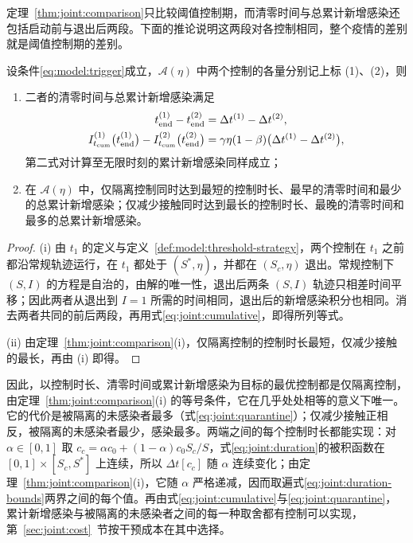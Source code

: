 定理~\ref{thm:joint:comparison}只比较阈值控制期，而清零时间与总累计新增感染还包括启动前与退出后两段。下面的推论说明这两段对各控制相同，整个疫情的差别就是阈值控制期的差别。
\begin{corollaryn}
\label{cor:joint:whole-epidemic}
设条件\eqref{eq:model:trigger}成立，$\mathcal A(\eta)$ 中两个控制的各量分别记上标 (1)、(2)，则
\begin{enumerate}
\renewcommand{\labelenumi}{(\roman{enumi})}
\item 二者的清零时间与总累计新增感染满足
\begin{align}
t_{\rm end}^{(1)}-t_{\rm end}^{(2)}
&=\Delta t^{(1)}-\Delta t^{(2)},\label{eq:joint:whole-time}\\
I_{t_{\mathrm{cum}}}^{(1)}\bigl(t_{\rm end}^{(1)}\bigr)-I_{t_{\mathrm{cum}}}^{(2)}\bigl(t_{\rm end}^{(2)}\bigr)
&=\gamma\eta(1-\beta)\bigl(\Delta t^{(1)}-\Delta t^{(2)}\bigr),
\label{eq:joint:whole-cumulative}
\end{align}
第二式对计算至无限时刻的累计新增感染同样成立；
\item 在 $\mathcal A(\eta)$ 中，仅隔离控制同时达到最短的控制时长、最早的清零时间和最少的总累计新增感染；仅减少接触同时达到最长的控制时长、最晚的清零时间和最多的总累计新增感染。
\end{enumerate}
\end{corollaryn}
\begin{proof}
(i) 由 $t_1$ 的定义与定义~\ref{def:model:threshold-strategy}，两个控制在 $t_1$ 之前都沿常规轨迹运行，在 $t_1$ 都处于 $(S^*,\eta)$，并都在 $(S_c,\eta)$ 退出。常规控制下 $(S,I)$ 的方程是自治的，由解的唯一性，退出后两条 $(S,I)$ 轨迹只相差时间平移；因此两者从退出到 $I=1$ 所需的时间相同，退出后的新增感染积分也相同。消去两者共同的前后两段，再用式\eqref{eq:joint:cumulative}，即得所列等式。

(ii) 由定理~\ref{thm:joint:comparison}(i)，仅隔离控制的控制时长最短，仅减少接触的最长，再由 (i) 即得。
\end{proof}
因此，以控制时长、清零时间或累计新增感染为目标的最优控制都是仅隔离控制，由定理~\ref{thm:joint:comparison}(i) 的等号条件，它在几乎处处相等的意义下唯一。它的代价是被隔离的未感染者最多（式\eqref{eq:joint:quarantine}）；仅减少接触正相反，被隔离的未感染者最少，感染最多。两端之间的每个控制时长都能实现：对 $\alpha\in[0,1]$ 取 $c_c=\alpha c_0+(1-\alpha)c_0S_c/S$，式\eqref{eq:joint:duration}的被积函数在 $[0,1]\times[S_c,S^*]$ 上连续，所以 $\Delta t[c_c]$ 随 $\alpha$ 连续变化；由定理~\ref{thm:joint:comparison}(i)，它随 $\alpha$ 严格递减，因而取遍式\eqref{eq:joint:duration-bounds}两界之间的每个值。再由式\eqref{eq:joint:cumulative}与\eqref{eq:joint:quarantine}，累计新增感染与被隔离的未感染者之间的每一种取舍都有控制可以实现，第~\ref{sec:joint:cost}~节按干预成本在其中选择。
